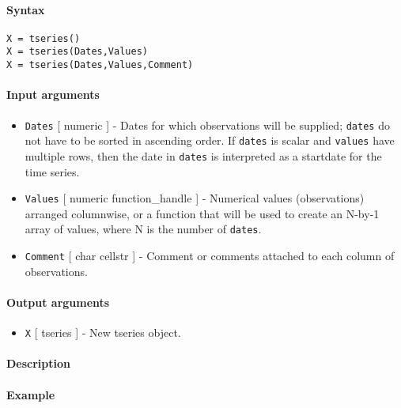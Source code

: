 


	\paragraph{Syntax}

\begin{verbatim}
X = tseries()
X = tseries(Dates,Values)
X = tseries(Dates,Values,Comment)
\end{verbatim}

\paragraph{Input arguments}

\begin{itemize}
\item
  \texttt{Dates} {[} numeric {]} - Dates for which observations will be
  supplied; \texttt{dates} do not have to be sorted in ascending order.
  If \texttt{dates} is scalar and \texttt{values} have multiple rows,
  then the date in \texttt{dates} is interpreted as a startdate for the
  time series.
\item
  \texttt{Values} {[} numeric \textbar{} function\_handle {]} -
  Numerical values (observations) arranged columnwise, or a function
  that will be used to create an N-by-1 array of values, where N is the
  number of \texttt{dates}.
\item
  \texttt{Comment} {[} char \textbar{} cellstr {]} - Comment or comments
  attached to each column of observations.
\end{itemize}

\paragraph{Output arguments}

\begin{itemize}
\itemsep1pt\parskip0pt
\item
  \texttt{X} {[} tseries {]} - New tseries object.
\end{itemize}

\paragraph{Description}

\paragraph{Example}


